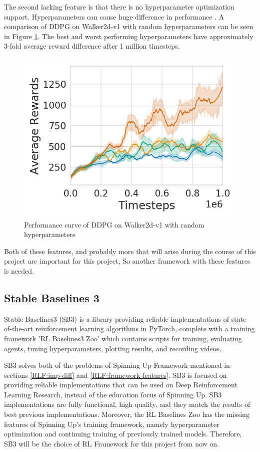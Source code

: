 The second lacking feature is that there is no hyperparameter optimization support. Hyperparameters can cause huge difference in performance \cite{hyperparameter-ddpg}. A comparison of DDPG on Walker2d-v1 with random hyperparameters can be seen in Figure \ref{fig:hyperparameter-ddpg}. The best and worst performing hyperparameters have approximately 3-fold average reward difference after 1 million timesteps.

\begin{figure}[h]
\centering
\includegraphics[width = 0.7\hsize]{figures/rl-framework/hyperparameter-ddpg.png}
\caption{Performance curve of DDPG on Walker2d-v1 with random hyperparameters \cite{hyperparameter-ddpg}}
\label{fig:hyperparameter-ddpg}
\end{figure}

Both of these features, and probably more that will arise during the course of this project are important for this project, So another framework with these features is needed.


\subsection{Stable Baselines 3}
Stable Baselines3 (SB3) is a library providing reliable implementations of state-of-the-art reinforcement learning algorithms in PyTorch, complete with a training framework 'RL Baselines3 Zoo' which contains scripts for training, evaluating agents, tuning hyperparameters, plotting results, and recording videos.\cite{stable-baselines3} 

SB3 solves both of the problems of Spinning Up Framework mentioned in sections \ref{RLF:imp-diff} and \ref{RLF:framework-features}. SB3 is focused on providing reliable implementations that can be used on Deep Reinforcement Learning Research, instead of the education focus of Spinning Up. SB3 implementations are fully functional, high quality, and they match the results of best previous implementations. Moreover, the RL Baselines Zoo has the missing features of Spinning Up's training framework, namely hyperparameter optimization and continuing training of previously trained models. Therefore, SB3 will be the choice of RL Framework for this project from now on.
